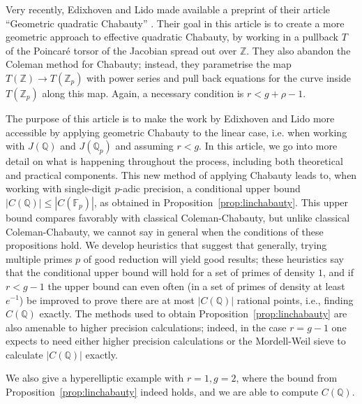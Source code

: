 \documentclass[12pt]{article}
\newcommand{\Z}{\mathbb{Z}}
\newcommand{\Q}{\mathbb{Q}}
\newcommand{\F}{\mathbb{F}}
\theoremstyle{plain}
\theoremstyle{definition}
\theoremstyle{remark}
\begin{document}
Very recently, Edixhoven and Lido made available a preprint of their article ``Geometric quadratic Chabauty'' \cite{edixhoven20}. Their goal in this article is to create a more geometric approach to effective quadratic Chabauty, by working in a pullback $T$ of the Poincar\'e torsor of the Jacobian spread out over $\Z$. They also abandon the Coleman method for Chabauty; instead, they parametrise the map $T(\Z) \to T(\Z_p)$ with power series and pull back equations for the curve inside $T(\Z_p)$ along this map. Again, a necessary condition is $r < g + \rho - 1$.

The purpose of this article is to make the work by Edixhoven and Lido more accessible by applying geometric Chabauty to the linear case, i.e. when working with $J(\Q)$ and $J(\Q_p)$ and assuming $r < g$. In this article, we go into more detail on what is happening throughout the process, including both theoretical and practical components. This new method of applying Chabauty leads to, when working with single-digit $p$-adic precision, a conditional upper bound $|C(\Q)| \leq |C(\F_p)|$, as obtained in Proposition~\ref{prop:linchabauty}. This upper bound compares favorably with classical Coleman-Chabauty, but unlike classical Coleman-Chabauty, we cannot say in general when the conditions of these propositions hold. We develop heuristics that suggest that generally, trying multiple primes $p$ of good reduction will yield good results; these heuristics say that the conditional upper bound will hold for a set of primes of density $1$, and if $r < g-1$ the upper bound can even often (in a set of primes of density at least $e^{-1}$) be improved to prove there are at most $|C(\Q)|$ rational points, i.e., finding $C(\Q)$ exactly. The methods used to obtain Proposition~\ref{prop:linchabauty} are also amenable to higher precision calculations; indeed, in the case $r = g-1$ one expects to need either higher precision calculations or the Mordell-Weil sieve to calculate $|C(\Q)|$ exactly.

We also give a hyperelliptic example with $r = 1, g = 2$, where the bound from Proposition~\ref{prop:linchabauty} indeed holds, and we are able to compute $C(\Q)$.
\end{document}
